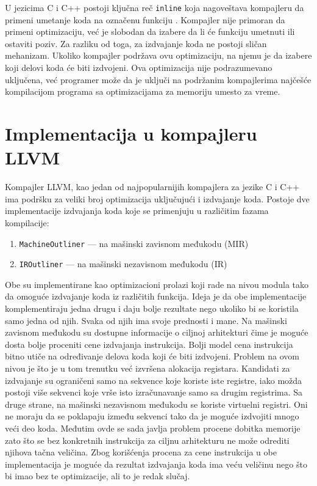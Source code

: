 \documentclass[12pt,oneside]{memoir}
\begin{document}
U jezicima C i C++ postoji ključna reč \verb|inline| koja nagoveštava kompajleru da primeni umetanje koda na označenu funkciju \cite{ISO:C99}.
Kompajler nije primoran da primeni optimizaciju, već je slobodan da izabere da li će funkciju umetnuti ili ostaviti poziv.
Za razliku od toga, za izdvajanje koda ne postoji sličan mehanizam.
Ukoliko kompajler podržava ovu optimizaciju, na njemu je da izabere koji delovi koda će biti izdvojeni.
Ova optimizacija nije podrazumevano uključena, već programer može da je uključi na podržanim kompajlerima najčešće kompilacijom programa sa optimizacijama za memoriju umesto za vreme.

\section{Implementacija u kompajleru LLVM}

Kompajler LLVM, kao jedan od najpopularnijih kompajlera za jezike C i C++ ima podršku za veliki broj optimizacija uključujući i izdvajanje koda.
Postoje dve implementacije izdvajanja koda koje se primenjuju u različitim fazama kompilacije:
\begin{enumerate}
  \item \verb|MachineOutliner| --- na mašinski zavisnom međukodu (MIR) \cite{paquette2016machineoutliner} %
  \item \verb|IROutliner| --- na mašinski nezavisnom međukodu (IR) \cite{litteken2020iroutliner} %
\end{enumerate}
Obe su implementirane kao optimizacioni prolazi koji rade na nivou modula tako da omoguće izdvajanje koda iz različitih funkcija.
Ideja je da obe implementacije komplementiraju jedna drugu i daju bolje rezultate nego ukoliko bi se koristila samo jedna od njih.
Svaka od njih ima svoje prednosti i mane.
Na mašinski zavisnom međukodu su dostupne informacije o ciljnoj arhitekturi čime je moguće dosta bolje proceniti cene izdvajanja instrukcija.
Bolji model cena instrukcija bitno utiče na određivanje delova koda koji će biti izdvojeni.
Problem na ovom nivou je što je u tom trenutku već izvršena alokacija registara.
Kandidati za izdvajanje su ograničeni samo na sekvence koje koriste iste registre, iako možda postoji više sekvenci koje vrše isto izračunavanje samo sa drugim registrima.
Sa druge strane, na mašinski nezavisnom međukodu se koriste virtuelni registri.
Oni ne moraju da se poklapaju između sekvenci tako da je moguće izdvojiti mnogo veći deo koda.
Međutim ovde se sada javlja problem procene dobitka memorije zato što se bez konkretnih instrukcija za ciljnu arhitekturu ne može odrediti njihova tačna veličina.
Zbog korišćenja procena za cene instrukcija u obe implementacija je moguće da rezultat izdvajanja koda ima veću veličinu nego što bi imao bez te optimizacije, ali to je redak slučaj.
\end{document}

